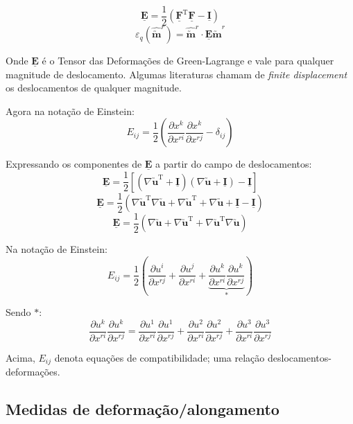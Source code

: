 	\[\underline{\mathbf{E}}=\frac{1}{2}(\underline{\mathbf{F}}^{\text{T}}\underline{\mathbf{F}}-\underline{\mathbf{I}})\]
	\[\varepsilon_q(\hat{\utilde{\mathbf{m}}}^r)=\hat{\utilde{\mathbf{m}}}^r\cdot\underline{\mathbf{E}}\hat{\utilde{\mathbf{m}}}^r\]
	
	Onde $\underline{\mathbf{E}}$ é o Tensor das Deformações de Green-Lagrange e vale para qualquer magnitude de deslocamento. Algumas literaturas chamam de \textit{finite displacement} os deslocamentos de qualquer magnitude.
	
	Agora na notação de Einstein:
	\[E_{ij}=\frac{1}{2}\left(\frac{\partial x^k}{\partial x^{ri}}\frac{\partial x^k}{\partial x^{rj}}-\delta_{ij}\right)\]
	
	Expressando os componentes de $\underline{\mathbf{E}}$ a partir do campo de deslocamentos:
	\[\underline{\mathbf{E}}=\frac{1}{2}[(\nabla\utilde{\mathbf{u}}^{\text{T}}+\underline{\mathbf{I}})(\nabla\utilde{\mathbf{u}}+\underline{\mathbf{I}})-\underline{\mathbf{I}}]\]
	\[\underline{\mathbf{E}}=\frac{1}{2}(\nabla\utilde{\mathbf{u}}^{\text{T}}\nabla\utilde{\mathbf{u}}+\nabla\utilde{\mathbf{u}}^{\text{T}}+\nabla\utilde{\mathbf{u}}+\underline{\mathbf{I}}-\underline{\mathbf{I}})\]
	\[\underline{\mathbf{E}}=\frac{1}{2}(\nabla\utilde{\mathbf{u}}+\nabla\utilde{\mathbf{u}}^{\text{T}}+\nabla\utilde{\mathbf{u}}^{\text{T}}\nabla\utilde{\mathbf{u}})\]
	
	Na notação de Einstein:
	\[E_{ij}=\frac{1}{2}\left(\frac{\partial u^i}{\partial x^{rj}}+\frac{\partial u^j}{\partial x^{ri}}+\underbrace{\frac{\partial u^k}{\partial x^{ri}}\frac{\partial u^k}{\partial x^{rj}}}_{*}\right)\]
	
	Sendo $*$:
	\[\frac{\partial u^k}{\partial x^{ri}}\frac{\partial u^k}{\partial x^{rj}}=\frac{\partial u^1}{\partial x^{ri}}\frac{\partial u^1}{\partial x^{rj}}+\frac{\partial u^2}{\partial x^{ri}}\frac{\partial u^2}{\partial x^{rj}}+\frac{\partial u^3}{\partial x^{ri}}\frac{\partial u^3}{\partial x^{rj}}\]
	
	Acima, $E_{ij}$ denota equações de compatibilidade; uma relação deslocamentos-deformações.
	
	\subsection{Medidas de deformação/alongamento}
	
